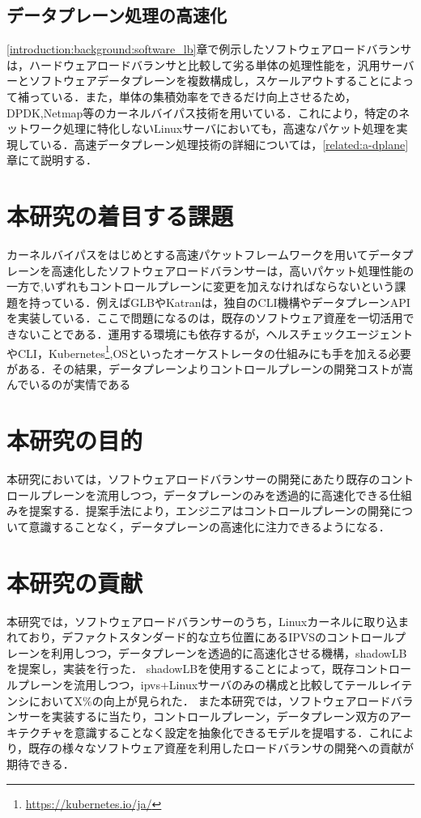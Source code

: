\subsection{データプレーン処理の高速化}
\ref{introduction:background:software_lb}章で例示したソフトウェアロードバランサは，ハードウェアロードバランサと比較して劣る単体の処理性能を，汎用サーバーとソフトウェアデータプレーンを複数構成し，スケールアウトすることによって補っている．また，単体の集積効率をできるだけ向上させるため，DPDK\cite{DPDK},Netmap\cite{netmap}等のカーネルバイパス技術を用いている．これにより，特定のネットワーク処理に特化しないLinuxサーバにおいても，高速なパケット処理を実現している．高速データプレーン処理技術の詳細については，\ref{related:a-dplane}章にて説明する．


\section{本研究の着目する課題}
カーネルバイパスをはじめとする高速パケットフレームワークを用いてデータプレーンを高速化したソフトウェアロードバランサーは，高いパケット処理性能の一方で,いずれもコントロールプレーンに変更を加えなければならないという課題を持っている．例えばGLBやKatranは，独自のCLI機構やデータプレーンAPIを実装している\cite{GLB-director}．ここで問題になるのは，既存のソフトウェア資産を一切活用できないことである．運用する環境にも依存するが，ヘルスチェックエージェントやCLI，Kubernetes\footnote{\url{https://kubernetes.io/ja/}},OSといったオーケストレータの仕組みにも手を加える必要がある．その結果，データプレーンよりコントロールプレーンの開発コストが嵩んでいるのが実情である\cite{slankdev_slides}

\section{本研究の目的}
本研究においては，ソフトウェアロードバランサーの開発にあたり既存のコントロールプレーンを流用しつつ，データプレーンのみを透過的に高速化できる仕組みを提案する．提案手法により，エンジニアはコントロールプレーンの開発について意識することなく，データプレーンの高速化に注力できるようになる．

\section{本研究の貢献}
本研究では，ソフトウェアロードバランサーのうち，Linuxカーネルに取り込まれており，デファクトスタンダード的な立ち位置にあるIPVS\cite{IPVS}のコントロールプレーンを利用しつつ，データプレーンを透過的に高速化させる機構，shadowLBを提案し，実装を行った． shadowLBを使用することによって，既存コントロールプレーンを流用しつつ，ipvs+Linuxサーバのみの構成と比較してテールレイテンシにおいてX\%の向上が見られた．
また本研究では，ソフトウェアロードバランサーを実装するに当たり，コントロールプレーン，データプレーン双方のアーキテクチャを意識することなく設定を抽象化できるモデルを提唱する．これにより，既存の様々なソフトウェア資産を利用したロードバランサの開発への貢献が期待できる．




